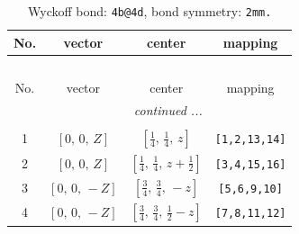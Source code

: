 \documentclass[fleqn,8pt]{jsarticle}
\begin{document}
\begin{longtable}{cccc}
\caption{Wyckoff bond: {\tt 4b@4d}, bond symmetry: {\tt 2mm.}}
 \\
 \hline \hline
No. & vector & center & mapping \\ \hline \endfirsthead

\multicolumn{3}{l}{\tablename\ \thetable{}} \\
 \hline \hline
No. & vector & center & mapping \\ \hline \endhead

 \hline \hline
\multicolumn{3}{r}{\footnotesize\it continued ...} \\ \endfoot

 \hline \hline
\multicolumn{3}{r}{} \\ \endlastfoot

1 & $\left[ 0,\, 0,\, Z \right]$ & $\left[ \frac{1}{4},\, \frac{1}{4},\, z \right]$ & {\tt [1,2,13,14]} \\ \hline
2 & $\left[ 0,\, 0,\, Z \right]$ & $\left[ \frac{1}{4},\, \frac{1}{4},\, z + \frac{1}{2} \right]$ & {\tt [3,4,15,16]} \\ \hline
3 & $\left[ 0,\, 0,\, - Z \right]$ & $\left[ \frac{3}{4},\, \frac{3}{4},\, - z \right]$ & {\tt [5,6,9,10]} \\ \hline
4 & $\left[ 0,\, 0,\, - Z \right]$ & $\left[ \frac{3}{4},\, \frac{3}{4},\, \frac{1}{2} - z \right]$ & {\tt [7,8,11,12]} \\
\end{longtable}
\renewcommand{\arraystretch}{1.2}
\end{document}
